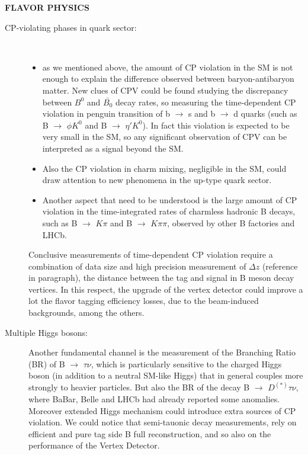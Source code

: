 \textbf{FLAVOR PHYSICS}
\begin{description}
\item [CP-violating phases in quark sector:]\
	\begin{itemize}
	\item as we mentioned above, the amount of CP violation in the SM is not enough to explain the difference observed between baryon-antibaryon matter. New clues of CPV could be found studying the discrepancy between $B^{0}$ and $\bar{B_{0}}$ decay rates, so measuring the time-dependent CP violation in penguin transition of  b $\rightarrow$ s and  b $\rightarrow$ d quarks (such as B $\rightarrow$ $\phi K^{0}$ and B $\rightarrow$ $\eta' K^{0}$). In fact this violation is expected to be very small in the SM, so any significant observation of CPV can be interpreted as a signal beyond the SM.
	\item Also the CP violation in charm mixing, negligible in the SM, could draw attention to new phenomena in the up-type quark sector.
	\item Another aspect that need to be understood is the large amount of CP violation in the time-integrated rates of charmless hadronic B decays, such as B $\rightarrow$ $K\pi$ and B $\rightarrow$ $K\pi \pi$, observed by other B factories and LHCb. 
	\end{itemize}

Conclusive measurements of time-dependent CP violation require a combination of data size and high precision measurement of $\Delta z$ (reference in paragraph), the distance between the tag and signal in B meson decay vertices. In this respect, the upgrade of the vertex detector could improve a lot the flavor tagging efficiency losses, due to the beam-induced backgrounds, among the others.

\item[Multiple Higgs bosons:] Another fundamental channel is the measurement of the Branching Ratio (BR) of B $\rightarrow$ $\tau\nu$, which is particularly sensitive to the charged Higgs boson (in addition to a neutral SM-like Higgs) that in general couples more strongly to heavier particles. But also the BR of the decay B $\rightarrow$ $D^{(*)}$$\tau\nu$, where BaBar, Belle and LHCb had already reported some anomalies. Moreover extended Higgs mechanism could introduce extra sources of CP violation.
We could notice that semi-tauonic decay measurements, rely on efficient and pure tag side B full reconstruction, and so also on the performance of the Vertex Detector.
\begin{comment}
In general the detection of b $\rightarrow$ $\tau$ $\rightarrow$ \textit{l} transitions requires good lepton identification below 700 MeV/c (Low momentum track finding).
\end{comment}


\end{description}
